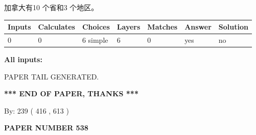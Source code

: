 \documentclass{ctexart}
\begin{document}
 
加拿大有10 个省和3 个地区。
 
 
\noindent{}
 
 
   
   
   
   
\noindent\begin{tabular}{|l|l|l|l|l|l|l|}
 \hline
Inputs & Calculates & Choices & Layers & Matches & Answer & Solution \\ \hline
 0  & 
 0  & 
 6
  simple  
  & 
 6  & 
 0  & 
  yes & 
  no 
  \\ \hline
 \end{tabular}
   
   
   
   
\noindent{}
   
   
   
   
\noindent\vspace{0.1in}\hspace{-0.08in} {\textbf{\Large{All inputs: }}}
   
   
   
   
   
   
 \vspace{0.2in}
 
   
   
\vspace{2.0in} PAPER TAIL GENERATED.
   
   
   
   
\vspace{1.0in} 
{\textbf{\large{ *** END OF PAPER, THANKS *** }}} 
   
   
\hspace{1.0in} By: 
 239 ( 416 ,  613 )
   
   
   
   
\newpage 
\setcounter{page}{ 
   538001 } 
   
   
   
   
 {\textbf{ \Large{ PAPER NUMBER  538  }}}
   
   
\vspace{0.2in}
   
   
   
   
   
   
   
\end{document}
